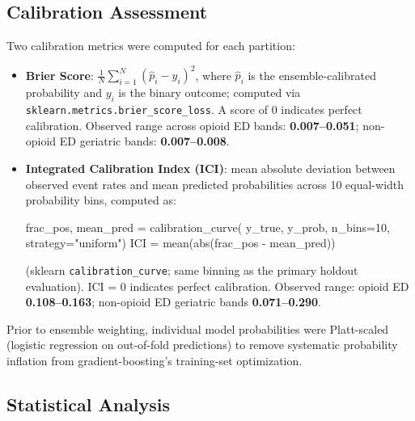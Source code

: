 \documentclass[
  12pt,
]{book}
\newenvironment{Shaded}{\begin{snugshade}}{\end{snugshade}}
\newcommand{\BuiltInTok}[1]{\textcolor[rgb]{0.00,0.23,0.31}{#1}}
\newcommand{\DecValTok}[1]{\textcolor[rgb]{0.68,0.00,0.00}{#1}}
\newcommand{\NormalTok}[1]{\textcolor[rgb]{0.00,0.23,0.31}{#1}}
\newcommand{\OperatorTok}[1]{\textcolor[rgb]{0.37,0.37,0.37}{#1}}
\newcommand{\StringTok}[1]{\textcolor[rgb]{0.13,0.47,0.30}{#1}}
\begin{document}
\subsection{Calibration Assessment}\label{calibration-assessment}

Two calibration metrics were computed for each partition:

\begin{itemize}
\item
  \textbf{Brier Score}:
  \(\frac{1}{N}\sum_{i=1}^{N}(\hat{p}_i - y_i)^2\), where \(\hat{p}_i\)
  is the ensemble-calibrated probability and \(y_i\) is the binary
  outcome; computed via \texttt{sklearn.metrics.brier\_score\_loss}. A
  score of 0 indicates perfect calibration. Observed range across opioid
  ED bands: \textbf{0.007--0.051}; non-opioid ED geriatric bands:
  \textbf{0.007--0.008}.
\item
  \textbf{Integrated Calibration Index (ICI)}: mean absolute deviation
  between observed event rates and mean predicted probabilities across
  10 equal-width probability bins, computed as:

\begin{Shaded}
\begin{Highlighting}[]
\NormalTok{frac\_pos, mean\_pred }\OperatorTok{=}\NormalTok{ calibration\_curve(}
\NormalTok{    y\_true, y\_prob, n\_bins}\OperatorTok{=}\DecValTok{10}\NormalTok{, strategy}\OperatorTok{=}\StringTok{"uniform"}\NormalTok{)}
\NormalTok{ICI }\OperatorTok{=}\NormalTok{ mean(}\BuiltInTok{abs}\NormalTok{(frac\_pos }\OperatorTok{{-}}\NormalTok{ mean\_pred))}
\end{Highlighting}
\end{Shaded}

  (sklearn \texttt{calibration\_curve}; same binning as the primary
  holdout evaluation). ICI = 0 indicates perfect calibration. Observed
  range: opioid ED \textbf{0.108--0.163}; non-opioid ED geriatric bands
  \textbf{0.071--0.290}.
\end{itemize}

Prior to ensemble weighting, individual model probabilities were
Platt-scaled (logistic regression on out-of-fold predictions) to remove
systematic probability inflation from gradient-boosting's training-set
optimization.

\subsection{Statistical Analysis}\label{statistical-analysis}
\end{document}
